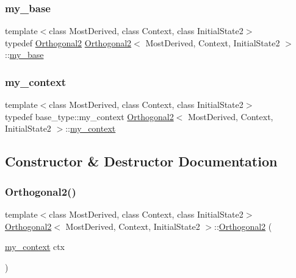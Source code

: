 \subsubsection{\texorpdfstring{my\+\_\+base}{my\_base}}
{\footnotesize\ttfamily template$<$class Most\+Derived, class Context, class Initial\+State2$>$ \\
typedef \mbox{\hyperlink{struct_orthogonal2}{Orthogonal2}} \mbox{\hyperlink{struct_orthogonal2}{Orthogonal2}}$<$ Most\+Derived, Context, Initial\+State2 $>$\+::\mbox{\hyperlink{struct_orthogonal2_a358118e3ce2f0ecb8725f77bcfcc4591}{my\+\_\+base}}}

\mbox{\label{struct_orthogonal2_a7ba3bc806df60eb29290185043ac202e}} 
\subsubsection{\texorpdfstring{my\+\_\+context}{my\_context}}
{\footnotesize\ttfamily template$<$class Most\+Derived, class Context, class Initial\+State2$>$ \\
typedef base\+\_\+type\+::my\+\_\+context \mbox{\hyperlink{struct_orthogonal2}{Orthogonal2}}$<$ Most\+Derived, Context, Initial\+State2 $>$\+::\mbox{\hyperlink{struct_orthogonal2_a7ba3bc806df60eb29290185043ac202e}{my\+\_\+context}}}



\subsection{Constructor \& Destructor Documentation}
\mbox{\label{struct_orthogonal2_ac814af29c27f7c0c38e7efd56c0926fa}} 
\subsubsection{\texorpdfstring{Orthogonal2()}{Orthogonal2()}}
{\footnotesize\ttfamily template$<$class Most\+Derived, class Context, class Initial\+State2$>$ \\
\mbox{\hyperlink{struct_orthogonal2}{Orthogonal2}}$<$ Most\+Derived, Context, Initial\+State2 $>$\+::\mbox{\hyperlink{struct_orthogonal2}{Orthogonal2}} (\begin{DoxyParamCaption}\item[{\mbox{\hyperlink{struct_orthogonal2_a7ba3bc806df60eb29290185043ac202e}{my\+\_\+context}}}]{ctx }\end{DoxyParamCaption})\hspace{0.3cm}{\ttfamily [inline]}}

